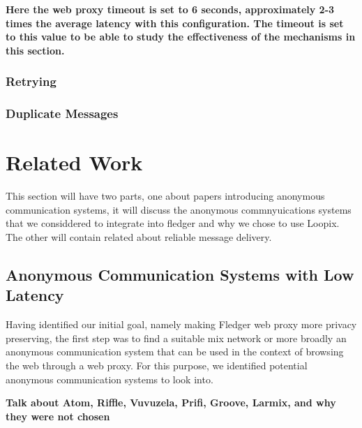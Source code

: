 \documentclass[a4paper,11pt,oneside]{report}
\begin{document}
\textbf{Here the web proxy timeout is set to 6 seconds, approximately 2-3 times the average latency with this configuration. The timeout is set to this value to be able to study the effectiveness of the mechanisms in this section.}
\subsection{Retrying}

\subsection{Duplicate Messages}


\chapter{Related Work}



This section will have two parts, one about papers introducing anonymous communication systems, it will discuss the anonymous commnyuications systems that we considdered to integrate into fledger and why we chose to use Loopix. The other will contain related about reliable message delivery.
\section{Anonymous Communication Systems with Low Latency}
\label{sec:mixers}
Having identified our initial goal, namely making Fledger web proxy more privacy preserving, the first step was to find a suitable mix network or more broadly an anonymous communication system that can be used in the context of browsing the web through a web proxy. For this purpose, we identified potential anonymous communication systems to look into.

\textbf{Talk about Atom, Riffle, Vuvuzela, Prifi, Groove, Larmix, and why they were not chosen}
\end{document}
